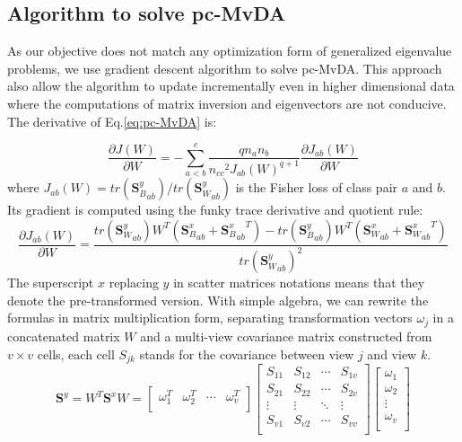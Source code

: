 
\subsection{Algorithm to solve pc-MvDA}
    As our objective does not match any optimization form of generalized eigenvalue problems, we use gradient descent algorithm to solve pc-MvDA. This approach also allow the algorithm to update incrementally even in higher dimensional data where the computations of matrix inversion and eigenvectors are not conducive. The derivative of Eq.\eqref{eq:pc-MvDA} is:

    \begin{equation}
        \frac{\partial J\left(W\right)}{\partial W}=-\sum_{a<b}^{c}{\frac{qn_an_b}{{n_{cc}}^2{J_{ab}\left(W\right)}^{q+1}}\frac{\partial J_{ab}\left(W\right)}{\partial W}}
    \end{equation}
    where $J_{ab}\left(W\right)={tr\left({\boldsymbol{S}_B^y}_{ab}\right)}/{tr\left({\boldsymbol{S}_W^y}_{ab}\right)}$ is the Fisher loss of class pair $a$ and $b$. Its gradient is computed using the funky trace derivative and quotient rule:
    \begin{equation}
        \frac{\partial J_{ab}\left(W\right)}{\partial W}=\frac{tr\left({\boldsymbol{S}_W^y}_{ab}\right)W^T\left({\boldsymbol{S}_B^x}_{ab}+{{\boldsymbol{S}_B^x}_{ab}}^T\right)-tr\left({\boldsymbol{S}_B^y}_{ab}\right)W^T\left({\boldsymbol{S}_W^x}_{ab}+{{\boldsymbol{S}_W^x}_{ab}}^T\right)}{{tr\left({\boldsymbol{S}_W^y}_{ab}\right)}^2}
        \label{eq:grad_Jab}
    \end{equation}
    The superscript $x$ replacing $y$ in scatter matrices notations means that they denote the pre-transformed version. With simple algebra, we can rewrite the formulas in matrix multiplication form, separating transformation vectors $\omega_j$ in a concatenated matrix $W$ and a multi-view covariance matrix constructed from $v\times v$ cells, each cell $S_{jk}$ stands for the covariance between view $j$ and view $k$.
    \begin{equation}
        \boldsymbol{S}^y=W^T\boldsymbol{S}^xW=\left[\begin{matrix}\omega_1^T&\omega_2^T&\cdots&\omega_v^T\\\end{matrix}\right]\left[\begin{matrix}S_{11}&S_{12}&\cdots&S_{1v}\\S_{21}&S_{22}&\cdots&S_{2v}\\\vdots&\vdots&\ddots&\vdots\\S_{v1}&S_{v2}&\cdots&S_{vv}\\\end{matrix}\right]\left[\begin{matrix}\omega_1\\\omega_2\\\vdots\\\omega_v\\\end{matrix}\right]
    \end{equation}

